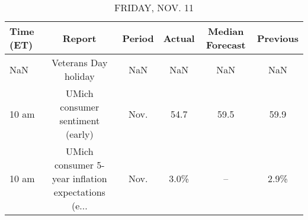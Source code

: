 \documentclass{article}%
\begin{document}
%


\begin{table}[htbp]%
\caption{FRIDAY, NOV. 11}%
\centering%
\begin{adjustbox}{width=1\textwidth}%
\begin{tabular}{lccccc}
\toprule
Time (ET) &                                             Report & Period & Actual & Median Forecast & Previous \\
\midrule
      NaN &                               Veterans Day holiday &    NaN &    NaN &             NaN &      NaN \\
    10 am &                   UMich consumer sentiment (early) &   Nov. &   54.7 &            59.5 &     59.9 \\
    10 am & UMich consumer 5-year inflation expectations (e... &   Nov. &   3.0\% &              -- &     2.9\% \\
\bottomrule
\end{tabular}
%
\end{adjustbox}%
\end{table}
\end{document}
